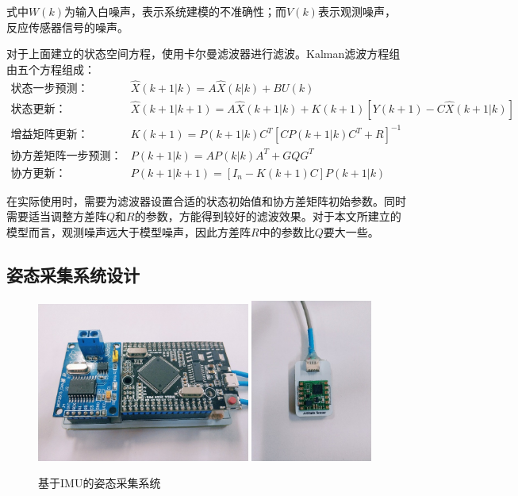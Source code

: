 式中$W(k)$为输入白噪声，表示系统建模的不准确性；而$V(k)$表示观测噪声，反应传感器信号的噪声。

对于上面建立的状态空间方程，使用卡尔曼滤波器\cite{p50}进行滤波。Kalman滤波方程组由五个方程组成：
\begin{align}
    状态一步预测： & \hat{X}(k+1|k) = A \hat{X}(k|k) + B U(k) \\
    状态更新：& \hat{X}(k+1|k+1) = A \hat{X}(k+1|k) + K(k+1)[Y(k+1)-C\hat{X}(k+1|k)] \\
    增益矩阵更新：& K(k+1) = P(k+1|k)C^T[CP(k+1|k)C^T + R]^{-1} \\
    协方差矩阵一步预测：& P(k+1|k) = AP(k|k)A^T+GQG^T \\
    协方更新：& P(k+1|k+1) = [I_n-K(k+1)C]P(k+1|k)
\end{align}

在实际使用时，需要为滤波器设置合适的状态初始值和协方差矩阵初始参数。同时需要适当调整方差阵$Q$和$R$的参数，方能得到较好的滤波效果。对于本文所建立的模型而言，观测噪声远大于模型噪声，因此方差阵$R$中的参数比$Q$要大一些。

\subsection{姿态采集系统设计}
\begin{figure}[htb]
    \label{fig:sub1}{\includegraphics[width=7cm]{fig/f40.jpg}}\quad
    \label{fig:sub2}{\includegraphics[width=4cm]{fig/f41.jpg}}
    \caption{基于IMU的姿态采集系统}
    \label{fig:subfigss}
\end{figure}

